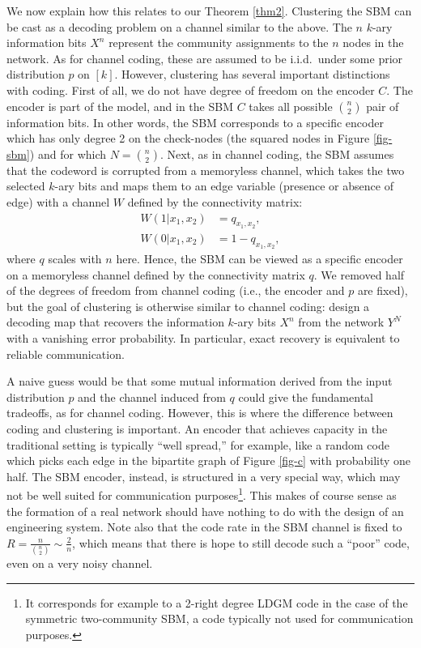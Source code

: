 \documentclass[11pt]{article}
\newcommand{\1}{\mathbb{1}}
\begin{document}
We now explain how this relates to our Theorem \ref{thm2}. Clustering the SBM can be cast as a decoding problem on a channel similar to the above. The $n$ $k$-ary information bits $X^n$ represent the community assignments to the $n$ nodes in the network. As for channel coding, these are assumed to be i.i.d.\ under some prior distribution $p$ on $[k]$.
However, clustering has several important distinctions with coding. First of all, we do not have degree of freedom on the encoder $C$. The encoder is part of the model, and in the SBM $C$ takes all possible ${n \choose 2}$ pair of information bits. In other words, the SBM corresponds to a specific encoder which has only degree 2 on the check-nodes (the squared nodes in Figure \ref{fig-sbm}) and for which $N={n \choose 2}$. Next, as in channel coding, the SBM assumes that the codeword is corrupted from a memoryless channel, which takes the two selected $k$-ary bits and maps them to an edge variable (presence or absence of edge) with a channel $W$ defined by the connectivity matrix:
\begin{align} 
W(1|x_1,x_2)&= q_{x_1,x_2},\\
W(0|x_1,x_2)&= 1-q_{x_1,x_2},
\end{align}
where $q$ scales with $n$ here. Hence, the SBM can be viewed as a specific encoder on a memoryless channel defined by the connectivity matrix $q$. We removed half of the degrees of freedom from channel coding (i.e., the encoder and $p$ are fixed), but the goal of clustering is otherwise similar to channel coding: design a decoding map that recovers the information $k$-ary bits $X^n$ from the network $Y^N$ with a vanishing error probability. In particular, exact recovery is equivalent to reliable communication. 


A naive guess would be that some mutual information derived from the input distribution $p$ and the channel induced from $q$ could give the fundamental tradeoffs, as for channel coding. However, this is where the difference between coding and clustering is important. An encoder that achieves capacity in the traditional setting is typically ``well spread,'' for example, like a random code which picks each edge in the bipartite graph of Figure \ref{fig-c} with probability one half. The SBM encoder, instead, is structured in a very special way, which may not be well suited for communication purposes\footnote{It corresponds for example to a 2-right degree LDGM code in the case of the symmetric two-community SBM, a code typically not used for communication purposes.}. This makes of course sense as the formation of a real network should have nothing to do with the design of an engineering system. Note also that the code rate in the SBM channel is fixed to $R=\frac{n}{{n \choose 2}} \sim \frac{2}{n}$, 
which means that there is hope to still decode such a ``poor'' code, even on a very noisy channel.  %
\end{document}
